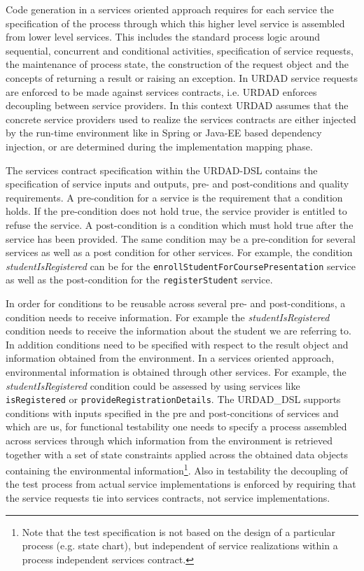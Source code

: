 Code generation in a services oriented approach requires for each service the specification of the process through which this higher level service is assembled from lower level services. This includes the standard process logic around sequential, concurrent and conditional activities, specification of service requests, the maintenance of process state, the construction of the request object and the concepts of returning a result or raising an exception. In URDAD service requests are enforced to be made against services contracts, i.e. URDAD enforces decoupling between service providers. In this context URDAD assumes that the concrete service providers used to realize the services contracts are either injected by the run-time environment like in Spring or Java-EE based dependency injection, or are determined during the implementation mapping phase.

The services contract specification within the URDAD-DSL contains the specification of service inputs and outputs, pre- and post-conditions and quality requirements. A pre-condition for a service is the requirement that a condition holds. If the pre-condition does not hold true, the service provider is entitled to refuse the service. A post-condition is a condition which must hold true after the service has been provided. The same condition may be a pre-condition for several services as well as a post condition for other services. For example, the condition \emph{studentIsRegistered} can be for the \verb+enrollStudentForCoursePresentation+ service as well as the post-condition for the \verb+registerStudent+ service. 

In order for conditions to be reusable across several pre- and post-conditions, a condition needs to receive information. For example the \emph{studentIsRegistered} condition needs to receive the information about the student we are referring to. In addition conditions need to be specified with respect to the result object and information obtained from the environment. In a services oriented approach, environmental information is obtained through other services. For example, the \emph{studentIsRegistered} condition could be assessed by using services like \verb+isRegistered+ or \verb+provideRegistrationDetails+. The URDAD_DSL supports conditions with inputs specified in the pre and post-concitions of services and which are us, for functional testability one needs to specify a process assembled across services through which information from the environment is retrieved together with a set of state constraints applied across the obtained data objects containing the environmental information\footnote{Note that the test specification is not based on the design of a particular process (e.g. state chart), but independent of service realizations within a process independent services contract.}. Also in testability the decoupling of the test process from actual service implementations is enforced by requiring that the service requests tie into services contracts, not service implementations. 
 

